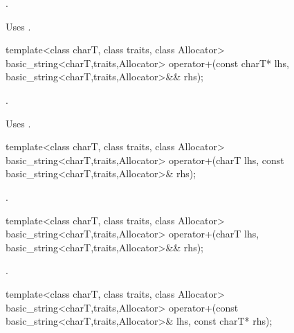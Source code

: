 \begin{itemdescr}
\pnum
\returns
{}.

\pnum
\notes
Uses
.
\end{itemdescr}

%
%
\begin{itemdecl}
template<class charT, class traits, class Allocator>
  basic_string<charT,traits,Allocator>
    operator+(const charT* lhs,
              basic_string<charT,traits,Allocator>&& rhs);
\end{itemdecl}

\begin{itemdescr}
\pnum
\returns
{}.

\pnum
\notes
Uses
.
\end{itemdescr}

%
%
\begin{itemdecl}
template<class charT, class traits, class Allocator>
  basic_string<charT,traits,Allocator>
    operator+(charT lhs,
              const basic_string<charT,traits,Allocator>& rhs);
\end{itemdecl}

\begin{itemdescr}
\pnum
\returns
{}.
\end{itemdescr}

%
%
\begin{itemdecl}
template<class charT, class traits, class Allocator>
  basic_string<charT,traits,Allocator>
    operator+(charT lhs,
              basic_string<charT,traits,Allocator>&& rhs);
\end{itemdecl}

\begin{itemdescr}
\pnum
\returns
{}.
\end{itemdescr}

%
%
\begin{itemdecl}
template<class charT, class traits, class Allocator>
  basic_string<charT,traits,Allocator>
    operator+(const basic_string<charT,traits,Allocator>& lhs,
              const charT* rhs);
\end{itemdecl}


